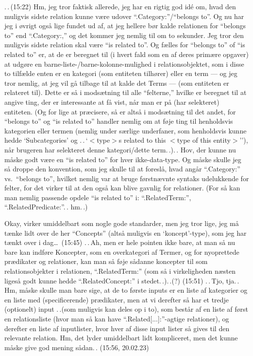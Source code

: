 \documentclass{report}
\begin{document}
.\,.\,(15:22) Hm, jeg tror faktisk allerede, jeg har en rigtig god idé om, hvad den muligvis sidste relation kunne være udover ``.Category:''/``belongs to''. Og nu har jeg i øvrigt også lige fundet ud af, at jeg hellere bør kalde relationen for ``belongs to'' end ``.Category:,'' og det kommer jeg nemlig til om to sekunder. Jeg tror den muligvis sidste relation skal være ``is related to''. Og fælles for ``belongs to'' of ``is related to'' er, at de er beregnet til (i hvert fald som en af deres primære opgaver) at udgøre en barne-liste-/barne-kolonne-mulighed i relationsobjektet, som i disse to tilfælde enten er en kategori (som entiteten tilhører) eller en term --- og jeg tror nemlig, at jeg vil gå tilbage til at kalde det Terms --- (som entiteten er relateret til). Dette er så i modsætning til alle ``felterne,'' hvilke er beregnet til at angive ting, der er interessante at få vist, når man er på (har selekteret) entiteten. (Og for lige at præcisere, så er altså i modsætning til det andet, for ``belongs to'' og ``is related to'' handler nemlig om at føje ting til henholdsvis kategorien eller termen (nemlig under særlige underfaner, som henholdsvis kunne hedde `Subcategories' og .\,.\,`$<$type$>$s related to this $<$type of this entity$>$''), når brugeren har selekteret denne kategori/dette term.\,.).\,. Hov, der kunne nu måske godt være en ``is related to'' for hver ikke-data-type. Og måske skulle jeg så droppe den konvention, som jeg skulle til at foreslå, hvad angår ``.Category:'' vs.\ ``belongs to'', hvilket nemlig var at bruge førstnævnte syntaks udelukkende for felter, for det virker til at den også kan blive gavnlig for relationer. (For så kan man nemlig passende opdele ``is related to'' i: ``.RelatedTerm:'', ``.RelatedPredicate:''.\,. hm.\,.) 

Okay, virker umiddelbart som nogle gode standarder, men jeg tror lige, jeg må tænke lidt over de her ``Concepts'' (altså muligvis en `koncept'-type), som jeg har tænkt over i dag\ldots\ (15:45) .\,.\,Ah, men er hele pointen ikke bare, at man så nu bare kan indføre Koncepter, som en overkategori af Termer, og for nyoprettede prædikater og relationer, kan man så føje sådanne koncepter til som relationsobjekter i relationen, ``.RelatedTerm:'' (som så i virkeligheden næsten ligeså godt kunne hedde ``.RelatedConcept:'' i stedet.\,.).\,.(?) (15:51) .\,.\,Tjo, tja.\,. Hm, måske skulle man bare sige, at de to første inputs er en liste af kategorier og en liste med (specificerende) prædikater, men at vi derefter så har et tredje (optionelt) input .\,.(som muligvis kan deles op i to), som består af en liste af først en relationsliste (hvor man så kan have ``.Related[...]:''-agtige relationer), og derefter en liste af inputlister, hvor hver af disse input lister så gives til den relevante relation. Hm, det lyder umiddelbart lidt kompliceret, men det kunne måske give god mening sådan.\,. (15:56, 20.02.23) 
\end{document}
